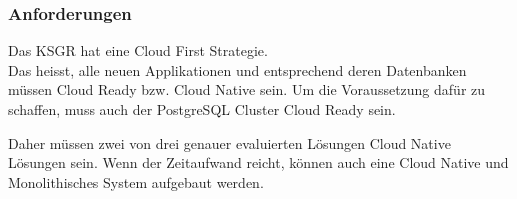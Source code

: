
\subsubsection{Anforderungen}
\begin{flushleft}
    Das KSGR hat eine Cloud First Strategie.\\
    Das heisst, alle neuen Applikationen und entsprechend deren Datenbanken müssen Cloud Ready bzw.
    Cloud Native sein.
    Um die Voraussetzung dafür zu schaffen, muss auch der PostgreSQL Cluster Cloud Ready sein.
\end{flushleft}
\begin{flushleft}
    Daher müssen zwei von drei genauer evaluierten Lösungen Cloud Native Lösungen sein.
    Wenn der Zeitaufwand reicht, können auch eine Cloud Native und Monolithisches System aufgebaut werden.
\end{flushleft}
\begin{flushleft}
    \clearpage
    \recalctypearea
    
    \clearpage
    \recalctypearea
\end{flushleft}
